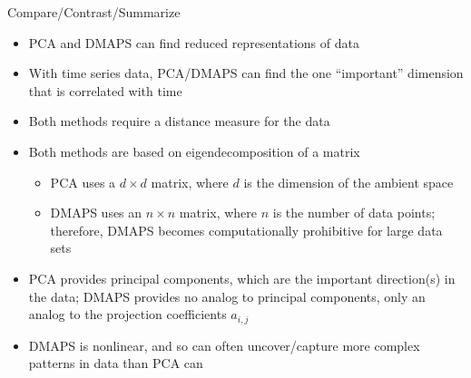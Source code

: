 \documentclass{beamer}
\begin{document}
\begin{frame}{Compare/Contrast/Summarize}
\begin{itemize}
\item PCA and DMAPS can find reduced representations of data
\item With time series data, PCA/DMAPS can find the one ``important'' dimension that is correlated with time
\item Both methods require a distance measure for the data
\item Both methods are based on eigendecomposition of a matrix
\begin{itemize}
\item PCA uses a $d \times d$ matrix, where $d$ is the dimension of the ambient space
\item DMAPS uses an $n \times n$ matrix, where $n$ is the number of data points; therefore, DMAPS becomes computationally prohibitive for large data sets
\end{itemize}
\item PCA provides principal components, which are the important direction(s) in the data; DMAPS provides no analog to principal components, only an analog to the projection coefficients $a_{i,j}$
\item DMAPS is nonlinear, and so can often uncover/capture more complex patterns in data than PCA can
\end{itemize}
\end{frame}
\end{document}
